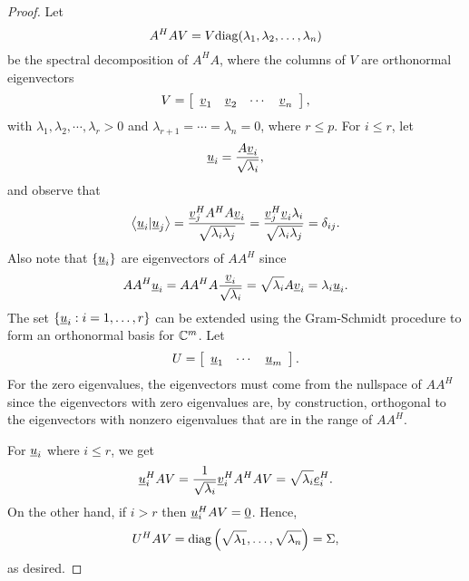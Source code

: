 \begin{proof}
Let
\begin{equation*}
A^H A V = V \mathrm{diag} ( \lambda_1, \lambda_2, \ldots, \lambda_n )
\end{equation*}
be the spectral decomposition of $A^H A$, where the columns of $V$ are orthonormal eigenvectors
\begin{equation*}
V = \left[ \begin{array}{cccc} \underline{v}_1 & \underline{v}_2 & \cdots & \underline{v}_n \end{array} \right], 
\end{equation*}
with $\lambda_1, \lambda_2, \cdots, \lambda_r > 0$ and $\lambda_{r+1} = \cdots = \lambda_{n} = 0$, where $r \leq p$.
For $i \leq r$, let
\begin{equation*}
\underline{u}_i = \frac{A \underline{v}_i}{\sqrt{\lambda_i}},
\end{equation*}
and observe that
\begin{equation*}
\left\langle \underline{u}_i | \underline{u}_j \right\rangle
= \frac{\underline{v}_j^H A^H A \underline{v}_i}{\sqrt{\lambda_i \lambda_j}}
= \frac{\underline{v}_j^H \underline{v}_i \lambda_i}{\sqrt{\lambda_i \lambda_j}}
= \delta_{ij} .
\end{equation*}
Also note that $\{ \underline{u}_i \}$ are eigenvectors of $A A^H$ since
\begin{equation*}
A A^H \underline{u}_i
= A A^H A \frac{\underline{v}_i}{\sqrt{\lambda_i}}
= \sqrt{\lambda_i} A \underline{v}_i
= \lambda_i \underline{u}_i .
\end{equation*}
The set $\left\{ \underline{u}_i: i = 1, \ldots, r \right\}$ can be extended using the Gram-Schmidt procedure to form an orthonormal basis for $\mathbb{C}^m$.
Let
\begin{equation*}
U = \left[ \begin{array}{ccc} \underline{u}_1 & \cdots & \underline{u}_m \end{array} \right] .
\end{equation*}
For the zero eigenvalues, the eigenvectors must come from the nullspace of $A A^H$ since the eigenvectors with zero eigenvalues are, by construction, orthogonal to the eigenvectors with nonzero eigenvalues that are in the range of $A A^H$.

For $\underline{u}_i$ where $i \leq r$, we get
\begin{equation*}
\underline{u}_i^H A V 
= \frac{1}{\sqrt{\lambda_i}} \underline{v}_i^H A^H A V
= \sqrt{\lambda_i} \underline{e}_i^H .
\end{equation*}
On the other hand, if $i > r$ then $\underline{u}_i^H A V = \underline{0}$.
Hence,
\begin{equation*}
U^H A V = \mathrm{diag} \left( \sqrt{\lambda_1}, \ldots, \sqrt{\lambda_n} \right)
= \Sigma ,
\end{equation*}
as desired.
\end{proof}

